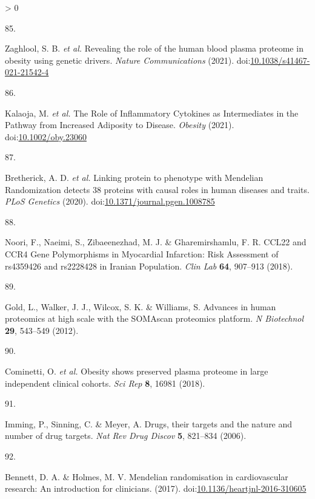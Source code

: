\documentclass[11pt,twoside]{bristolthesis}
\newlength{\cslhangindent}
\newlength{\csllabelwidth}
\newenvironment{CSLReferences}[2] %
 {%
  \setlength{\parindent}{0pt}
  \ifodd #1 \everypar{\setlength{\hangindent}{\cslhangindent}}\ignorespaces\fi
  \ifnum #2 > 0
  \setlength{\parskip}{#2\baselineskip}
  \fi
 }%
 {}
\newcommand{\CSLLeftMargin}[1]{\parbox[t]{\csllabelwidth}{#1}}
\newcommand{\CSLRightInline}[1]{\parbox[t]{\linewidth - \csllabelwidth}{#1}\break}
\begin{document}
\begin{CSLReferences}{0}{0}
\leavevmode\hypertarget{ref-Zaghlool2021}{}%
\CSLLeftMargin{85. }
\CSLRightInline{Zaghlool, S. B. \emph{et al.} {Revealing the role of the human blood plasma proteome in obesity using genetic drivers}. \emph{Nature Communications} (2021). doi:\href{https://doi.org/10.1038/s41467-021-21542-4}{10.1038/s41467-021-21542-4}}

\leavevmode\hypertarget{ref-Kalaoja2021}{}%
\CSLLeftMargin{86. }
\CSLRightInline{Kalaoja, M. \emph{et al.} {The Role of Inflammatory Cytokines as Intermediates in the Pathway from Increased Adiposity to Disease}. \emph{Obesity} (2021). doi:\href{https://doi.org/10.1002/oby.23060}{10.1002/oby.23060}}

\leavevmode\hypertarget{ref-Bretherick2020}{}%
\CSLLeftMargin{87. }
\CSLRightInline{Bretherick, A. D. \emph{et al.} {Linking protein to phenotype with Mendelian Randomization detects 38 proteins with causal roles in human diseases and traits}. \emph{PLoS Genetics} (2020). doi:\href{https://doi.org/10.1371/journal.pgen.1008785}{10.1371/journal.pgen.1008785}}

\leavevmode\hypertarget{ref-Noori2018}{}%
\CSLLeftMargin{88. }
\CSLRightInline{Noori, F., Naeimi, S., Zibaeenezhad, M. J. \& Gharemirshamlu, F. R. {CCL22 and CCR4 Gene Polymorphisms in Myocardial Infarction: Risk Assessment of rs4359426 and rs2228428 in Iranian Population}. \emph{Clin Lab} \textbf{64}, 907--913 (2018).}

\leavevmode\hypertarget{ref-Gold2012}{}%
\CSLLeftMargin{89. }
\CSLRightInline{Gold, L., Walker, J. J., Wilcox, S. K. \& Williams, S. {Advances in human proteomics at high scale with the SOMAscan proteomics platform}. \emph{N Biotechnol} \textbf{29}, 543--549 (2012).}

\leavevmode\hypertarget{ref-Cominetti2018}{}%
\CSLLeftMargin{90. }
\CSLRightInline{Cominetti, O. \emph{et al.} {Obesity shows preserved plasma proteome in large independent clinical cohorts}. \emph{Sci Rep} \textbf{8}, 16981 (2018).}

\leavevmode\hypertarget{ref-Imming2006}{}%
\CSLLeftMargin{91. }
\CSLRightInline{Imming, P., Sinning, C. \& Meyer, A. {Drugs, their targets and the nature and number of drug targets}. \emph{Nat Rev Drug Discov} \textbf{5}, 821--834 (2006).}

\leavevmode\hypertarget{ref-Bennett2017}{}%
\CSLLeftMargin{92. }
\CSLRightInline{Bennett, D. A. \& Holmes, M. V. {Mendelian randomisation in cardiovascular research: An introduction for clinicians}. (2017). doi:\href{https://doi.org/10.1136/heartjnl-2016-310605}{10.1136/heartjnl-2016-310605}}


\end{CSLReferences}
\end{document}
